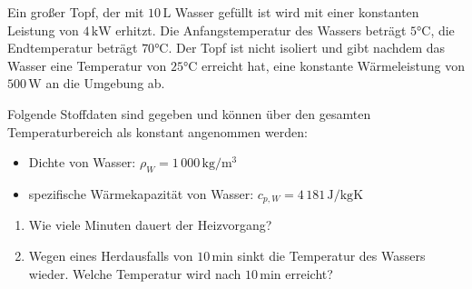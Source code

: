 \documentclass[german,12pt]{homework}
\newcommand{\sis}[1]{\,\si{#1}}
\newcommand{\degC}{\si{\degreeCelsius}}
\begin{document}
    \begin{problem}
        Ein großer Topf, der mit \(10\sis{\liter}\) Wasser gefüllt ist wird mit
        einer konstanten Leistung von \(4\sis{\kilo\watt}\) erhitzt. Die
        Anfangstemperatur des Wassers beträgt \(5\degC\), die Endtemperatur
        beträgt \(70\degC\). Der Topf ist nicht isoliert und gibt nachdem das
        Wasser eine Temperatur von \(25\degC\) erreicht hat, eine konstante
        Wärmeleistung von \(500\sis{\watt}\) an die Umgebung ab.

        Folgende Stoffdaten sind gegeben und können über den gesamten
        Temperaturbereich als konstant angenommen werden:
        \begin{itemize}
            \item Dichte von Wasser: \(\rho_W = 1\,000
            \sis{\kilogram\per\meter\cubed}\)
            \item spezifische Wärmekapazität von Wasser: \(c_{p, W} =
            4\,181\sis{\joule\per\kilogram\kelvin}\)
        \end{itemize}
        \begin{enumerate}
            \item Wie viele Minuten dauert der Heizvorgang?
            \item Wegen eines Herdausfalls von \(10\sis{\minute}\) sinkt die
            Temperatur des Wassers wieder. Welche Temperatur wird nach
            \(10\sis{\minute}\) erreicht?
        \end{enumerate}
    \end{problem}
\end{document}

